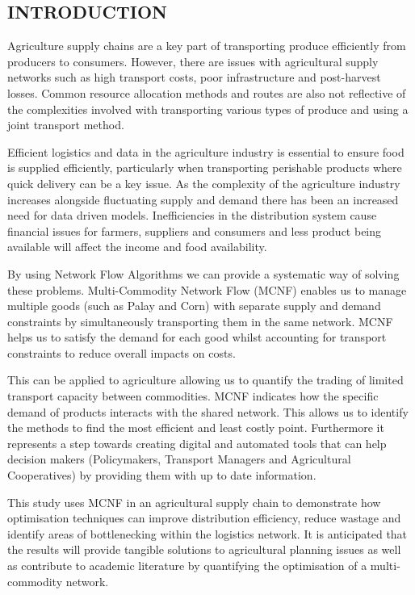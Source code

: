 \documentclass{icsthesis}
\begin{document}
\begin{mainmatter}
\section{INTRODUCTION}
Agriculture supply chains are a key part of transporting produce efficiently from producers to consumers. However, there are issues with agricultural supply networks such as high transport costs, poor infrastructure and post-harvest losses. Common resource allocation methods and routes are also not reflective of the complexities involved with transporting various types of produce and using a joint transport method.

Efficient logistics and data in the agriculture industry is essential to ensure food is supplied efficiently, particularly when transporting perishable products where quick delivery can be a key issue. As the complexity of the agriculture industry increases alongside fluctuating supply and demand there has been an increased need for data driven models. Inefficiencies in the distribution system cause financial issues for farmers, suppliers and consumers and less product being available will affect the income and food availability.

By using Network Flow Algorithms we can provide a systematic way of solving these problems. Multi-Commodity Network Flow (MCNF) enables us to manage multiple goods (such as Palay and Corn) with separate supply and demand constraints by simultaneously transporting them in the same network. MCNF helps us to satisfy the demand for each good whilst accounting for transport constraints to reduce overall impacts on costs.

This can be applied to agriculture allowing us to quantify the trading of limited transport capacity between commodities. MCNF indicates how the specific demand of products interacts with the shared network. This allows us to identify the methods to find the most efficient and least costly point. Furthermore it represents a step towards creating digital and automated tools that can help decision makers (Policymakers, Transport Managers and Agricultural Cooperatives) by providing them with up to date information.

This study uses MCNF in an agricultural supply chain to demonstrate how optimisation techniques can improve distribution efficiency, reduce wastage and identify areas of bottlenecking within the logistics network. It is anticipated that the results will provide tangible solutions to agricultural planning issues as well as contribute to academic literature by quantifying the optimisation of a multi-commodity network.


\end{mainmatter}
\end{document}
